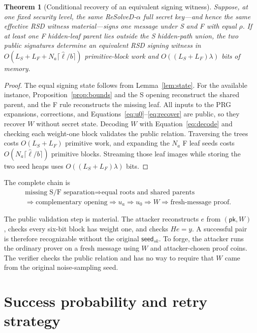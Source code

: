 \documentclass[11pt,a4paper]{article}
\newtheorem{theorem}{Theorem}
\newcommand{\pk}{\ensuremath{\mathsf{pk}}}
\begin{document}
\begin{theorem}[Conditional recovery of an equivalent signing witness]
\label{thm:attack}
Suppose, at one fixed security level, the same ReSolveD-$\alpha$ full secret
key---and hence the same effective RSD witness material---signs one message
under S and F with equal $\rho$.  If at least one F hidden-leaf parent lies
outside the S hidden-path union, the two public signatures determine an
equivalent RSD signing witness in
$O(L_S+L_F+N_a\lceil\widehat{\ell}/b\rceil)$ primitive-block work and
$O((L_S+L_F)\lambda)$ bits of memory.
\end{theorem}
\begin{proof}
The equal signing state follows from Lemma~\ref{lem:state}.  For the available
instance, Proposition~\ref{prop:bounds} and the S opening reconstruct the shared
parent, and the F rule reconstructs the missing leaf.  All inputs to the PRG
expansions, corrections, and Equations~\eqref{eq:u0}--\eqref{eq:recover} are
public, so they recover $W$ without secret state.  Decoding $W$ with
Equation~\eqref{eq:decode} and checking each weight-one block validates the
public relation.  Traversing the trees costs $O(L_S+L_F)$ primitive work, and
expanding the $N_a$ F leaf seeds costs
$O(N_a\lceil\widehat{\ell}/b\rceil)$ primitive blocks.  Streaming those leaf
images while storing the two seed heaps uses
$O((L_S+L_F)\lambda)$ bits.
\end{proof}

The complete chain is
\[
\boxed{\begin{array}{c}
\text{missing S/F separation}\Longrightarrow\text{equal roots and shared parents}\\
\Longrightarrow\text{complementary opening}\Longrightarrow u_a
\Longrightarrow u_0\Longrightarrow W\Longrightarrow\text{fresh-message proof.}
\end{array}}
\]

The public validation step is material.  The attacker reconstructs $e$ from
$(\pk,W)$, checks every six-bit block has weight one, and checks $He=y$.  A
successful pair is therefore recognizable without the original
$\mathsf{seed}_{sk}$.  To forge, the attacker runs the ordinary prover on a
fresh message using $W$ and attacker-chosen proof coins.  The verifier checks
the public relation and has no way to require that $W$ came from the original
noise-sampling seed.

\section{Success probability and retry strategy}
\end{document}
